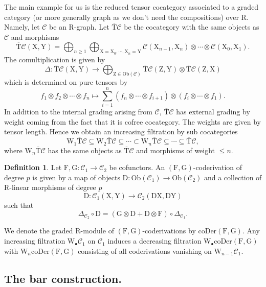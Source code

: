 \documentclass{article}
\theoremstyle{plain}
\theoremstyle{definition}
\newtheorem{definition}[theorem]{Definition}
\theoremstyle{remark}
\newcommand{\mr}{\mathrm}
\newcommand{\3}{\vspace{3mm}}
\newcommand{\2}{\vspace{2mm}}
\newcommand{\1}{\vspace{1mm}}
\begin{document}
The main example for us is the reduced tensor cocategory associated to a graded category (or more generally graph as we don't need the compositions) over $\mr{R}$. Namely, let $\mathcal{C}$ be an $\mr{R}$-graph. Let $\overline{\mr{T}}\mathcal{C}$ be the cocategory with the same objects as $\mathcal{C}$ and morphisms $$\overline{\mr{T}}\mathcal{C}(\mr{X,Y})=\bigoplus_{n\ge 1}\bigoplus_{\mr{X}=\mr{X}_0,\cdots,\mr{X}_n=\mr{Y}}\mathcal{C}(\mr{X}_{n-1},\mr{X}_n)\otimes \cdots\otimes \mathcal{C}(\mr{X}_0,\mr{X}_1).$$ The comultiplication is given by $$\Delta:\overline{\mr{T}}\mathcal{C}(\mr{X,Y})\rightarrow\bigoplus_{\mr{Z}\in \mr{Ob}(\mathcal{C})}\overline{\mr T}\mathcal{C}(\mr{Z},\mr{Y})\otimes \overline{\mr T}\mathcal{C}(\mr{Z},\mr{X})$$ which is determined on pure tensors by $$f_1\otimes f_2\otimes \cdots\otimes f_n\mapsto \sum_{i=1}^{n}\left(f_n\otimes \cdots \otimes f_{i+1}\right)\otimes \left(f_i\otimes \cdots \otimes f_1\right).$$
In addition to the internal grading arising from $\mathcal{C}$, $\overline{\mr T}\mathcal{C}$ has external grading by weight coming from the fact that it is cofree cocategory. The weights are given by tensor length. Hence we obtain an increasing filtration by sub cocategories $$\mr{W}_1\overline{\mr T}\mathcal{C} \subseteq \mr{W}_2\overline{\mr T}\mathcal{C}\subseteq \cdots \subset \mr{W}_n\overline{\mr T}\mathcal{C}\subseteq \cdots \subseteq \overline{\mr T}\mathcal{C},$$ where $\mr{W}_n\overline{\mr T}\mathcal{C}$ has the same objects as $\overline{\mr T}\mathcal{C}$ and morphisms of weight $\le n$.
\2
\begin{definition}
Let $\mr{F,G}:\mathcal{C}_1\to \mathcal{C}_2$ be cofunctors. An $\left(\mr{F,G}\right)$-coderivation of degree $p$ is given by a map of objects $\mr{D}:\mr{Ob}(\mathcal{C}_1)\to \mr{Ob}(\mathcal{C}_2)$ and a collection of $\mr{R}$-linear morphisms of degree $p$ $$\mr{D}:\mathcal{C}_1(\mr{X,Y})\to \mathcal{C}_2(\mr{D}\mr{X},\mr{D}\mr{Y})$$ 
such that $$\Delta_{\mathcal{C}_2}\circ \mr{D}=\left(\mr{G}\otimes \mr{D}+\mr{D}\otimes \mr{F}\right)\circ \Delta_{\mathcal{C}_1}.$$
\end{definition}
We denote the graded $\mr{R}$-module of $(\mr{F,G})$-coderivations by $\mr{coDer}(\mr{F,G})$. Any increasing filtration $\mr{W}_\bullet\mathcal{C}_1$ on $\mathcal{C}_1$ induces a decreasing filtration $\mr{W}_\bullet\mr{coDer}(\mr{F,G})$ with $\mr{W}_n\mr{coDer}(\mr{F,G})$ consisting of all coderivations vanishing on $\mr{W}_{n-1}\mathcal{C}_1$.

\subsection{The bar construction.}
\end{document}
